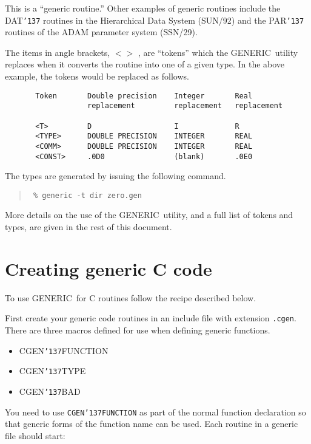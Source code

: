 \documentclass[twoside,11pt]{article}
\renewcommand{\_}{{\tt\char'137}}     %
\newcommand{\xref}[3]{#1}
\newcommand{\GENERIC}{{\footnotesize GENERIC}\normalsize}
\begin{document}
This is a ``generic routine.''
Other examples of generic routines include the DAT\_ routines in
the \xref{Hierarchical Data System}{sun92}{} (SUN/92) and the 
\xref{PAR\_ routines}{sun114}{} of the \xref{ADAM parameter 
system}{ssn29}{} (SSN/29).

The items in angle brackets, $<>$ , are ``tokens'' which the 
\GENERIC\ utility replaces when it converts the routine into one 
of a given type.
In the above example, the tokens would be replaced
as follows.

\begin{verbatim}
       Token       Double precision    Integer       Real
                   replacement         replacement   replacement

       <T>         D                   I             R
       <TYPE>      DOUBLE PRECISION    INTEGER       REAL
       <COMM>      DOUBLE PRECISION    INTEGER       REAL
       <CONST>     .0D0                (blank)       .0E0
\end{verbatim}

The types are generated by issuing the following command.

\begin{quote}{\tt
\% generic -t dir zero.gen
}
\end{quote}

More details on the use of the \GENERIC\ utility, and a full list of 
tokens and types, are given in the rest of this document.

\section{Creating generic C code}

To use \GENERIC\ for C routines follow the recipe described below.

First create your generic code routines in an include file with extension
{\tt .cgen}.  There are three macros defined for use when defining
generic functions.

\begin{itemize}
\item CGEN\_FUNCTION
\item CGEN\_TYPE
\item CGEN\_BAD
\end{itemize}

You need to use {\tt CGEN\_FUNCTION} as part of the normal function
declaration so that generic forms of the function name can be
used.  Each routine in a generic file should start:
\end{document}
